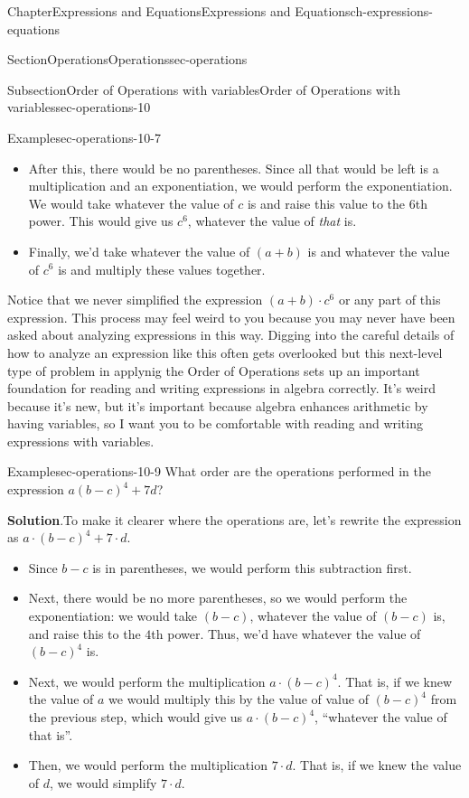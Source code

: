 \documentclass[twoside,11pt,]{book}
\newcommand{\blocktitlefont}{\relax}
\numberwithin{equation}{chapter}
\begin{document}
\begin{chapterptx}{Chapter}{Expressions and Equations}{}{Expressions and Equations}{}{}{ch-expressions-equations}
\begin{sectionptx}{Section}{Operations}{}{Operations}{}{}{sec-operations}
\begin{subsectionptx}{Subsection}{Order of Operations with variables}{}{Order of Operations with variables}{}{}{sec-operations-10}
\begin{example}{Example}{}{sec-operations-10-7}
\begin{itemize}[label=\textbullet]
\item{}After this, there would be no parentheses. Since all that would be left is a multiplication and an exponentiation, we would perform the exponentiation. We would take whatever the value of \(c\) is and raise this value to the \(6\)th power. This would give us \(c^6\), whatever the value of \emph{that} is.%
\item{}Finally, we'd take whatever the value of \((a+b)\) is and whatever the value of \(c^6\) is and multiply these values together.%
\end{itemize}
%
\end{example}
Notice that we never simplified the expression \((a+b) \cdot c^6\) or any part of this expression. This process may feel weird to you because you may never have been asked about analyzing expressions in this way. Digging into the careful details of how to analyze an expression like this often gets overlooked but this next-level type of problem in applynig the Order of Operations sets up an important foundation for reading and writing expressions in algebra correctly. It's weird because it's new, but it's important because algebra enhances arithmetic by having variables, so I want you to be comfortable with reading and writing expressions with variables.%
\begin{example}{Example}{}{sec-operations-10-9}%
What order are the operations performed in the expression \(a(b-c)^4+7d\)?%
\par\smallskip%
\noindent\textbf{\blocktitlefont Solution}.\hypertarget{sec-operations-10-9-2}{}\quad{}To make it clearer where the operations are, let's rewrite the expression as \(a \cdot (b-c)^4 + 7 \cdot d\).%
\par
%
\begin{itemize}[label=\textbullet]
\item{}Since \(b-c\) is in parentheses, we would perform this subtraction first.%
\item{}Next, there would be no more parentheses, so we would perform the exponentiation: we would take \((b-c)\), whatever the value of \((b-c)\) is, and raise this to the \(4\)th power. Thus, we'd have whatever the value of \((b-c)^4\) is.%
\item{}Next, we would perform the multiplication \(a \cdot (b-c)^4\). That is, if we knew the value of \(a\) we would multiply this by the value of value of \((b-c)^4\) from the previous step, which would give us \(a \cdot (b-c)^4\), ``whatever the value of that is''.%
\item{}Then, we would perform the multiplication \(7 \cdot d\). That is, if we knew the value of \(d\), we would simplify \(7 \cdot d\).%

\end{itemize}
\end{example}
\end{subsectionptx}
\end{sectionptx}
\end{chapterptx}
\end{document}

